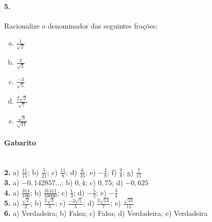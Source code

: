 \documentclass[a4paper,twocolumn,12pt]{article}
\begin{document}
\paragraph*{5. } Racionalize o denominador das seguintes frações:
\begin{enumerate}[a)]
\item $\displaystyle\frac{1}{\sqrt{2}}$
\item $\displaystyle\frac{2}{\sqrt{3}}$
\item $\displaystyle\frac{-3}{\sqrt{5}}$
\item $\displaystyle\frac{2\sqrt{2}}{\sqrt{7}}$
\item $\displaystyle\frac{\sqrt{3}}{\sqrt{11}}$
\end{enumerate}



\vfill

{\footnotesize
\paragraph*{Gabarito} \hspace*{\fill}\\ 
\textbf{2.} a) $\frac{11}{15}$; b) $\frac{5}{21}$; c) $\frac{11}{8}$; d) $\frac{6}{35}$; e) $-\frac{3}{8}$; f) $\frac{9}{8}$; g) $\frac{7}{15}$\\
\textbf{3.} a) $-0,142857...$; b) $0,4$; c) $0,75$; d) $-0,625$\\
\textbf{4.} a) $\frac{314}{100}$; b) $\frac{31411}{10000}$; c) $\frac{1}{3}$; d) $-\frac{5}{2}$; e) $-\frac{3}{4}$\\
\textbf{5.} a) $\frac{\sqrt{2}}{2}$; b) $\frac{2\sqrt{3}}{3}$; c) $\frac{-3\sqrt{5}}{5}$; d) $\frac{2\sqrt{14}}{7}$; e) $\frac{\sqrt{33}}{11}$\\
\textbf{6.} a) Verdadeira; b) Falsa; c) Falsa; d) Verdadeira; e) Verdadeira
}
\end{document}
